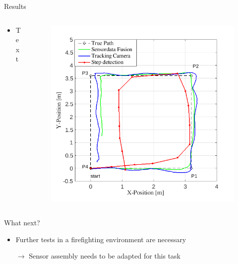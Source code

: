\documentclass[aspectratio=1609]{beamer}
\begin{document}
	\begin{frame}{Results}
		\begin{columns}
			\begin{column}{0.45\textwidth}
				\begin{itemize}
					\item Text
				\end{itemize}
			\end{column}
			\begin{column}{0.54\textwidth}
				\begin{figure}
					\centering
					\includegraphics[width=0.9\linewidth]{../Conference_Paper/Path}
					\caption{}
					\label{fig:path}
				\end{figure}
			\end{column}
					
			
		\end{columns}
	\end{frame}
	
	\begin{frame}{What next?}
		\begin{itemize}
			\item Further tests in a firefighting environment are necessary
			\item[$\rightarrow$] Sensor assembly needs to be adapted for this task
		\end{itemize}
		
	\end{frame}

	
\end{document}
